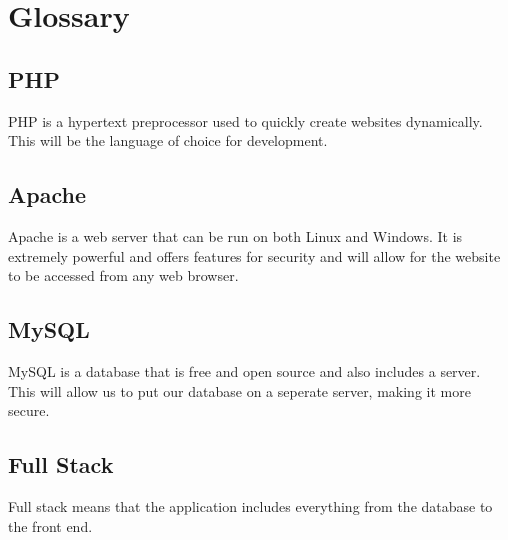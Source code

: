\documentclass[12pt]{article}
\begin{document}
\newpage
\section{Glossary}
        \subsection{PHP}
                PHP is a hypertext preprocessor used to quickly create websites
                dynamically. This will be the language of choice for development.

        \subsection{Apache}
                Apache is a web server that can be run on both Linux and Windows.
                It is extremely powerful and offers features for security and will
                allow for the website to be accessed from any web browser.

        \subsection{MySQL}
                MySQL is a database that is free and open source and also includes
                a server. This will allow us to put our database on a seperate 
                server, making it more secure.

        \subsection{Full Stack}
                Full stack means that the application includes everything from
                the database to the front end.
\end{document}
